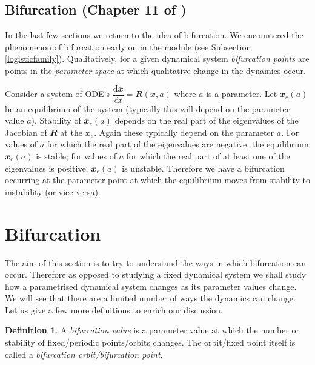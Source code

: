 \documentclass[
  a4paper,
  oneside,
  final]{krantz}
\renewcommand{\d}{\mathrm{d}}
\renewcommand{\v}[1]{{\mathbfit{#1}}}
\newcommand{\der}[2]{\dfrac{\d #1}{\d #2}}
\theoremstyle{definition}
\newtheorem{definition}{Definition}[chapter]
\theoremstyle{definition}
\theoremstyle{definition}
\theoremstyle{definition}
\theoremstyle{remark}
\begin{document}
\hypertarget{bifurcation}{%
\subsection{\texorpdfstring{Bifurcation (Chapter 11 of \citep{ASY})}{Bifurcation (Chapter 11 of {[}@ASY{]})}}\label{bifurcation}}

In the last few sections we return to the idea of bifurcation. We
encountered the phenomenon of bifurcation early on in the module (see
Subsection \ref{logisticfamily}). Qualitatively, for a given dynamical
system \emph{bifurcation points} are points in the \emph{parameter space} at which
qualitative change in the dynamics occur.

Consider a system of ODE's \(\der{\v{x}}{t} = \v{R}(\v{x}, a)\) where \(a\)
is a parameter. Let \(\v{x}_{e}(a)\) be an equilibrium of the system
(typically this will depend on the parameter value \(a\)). Stability of
\(\v{x}_{e}(a)\) depends on the real part of the eigenvalues of the
Jacobian of \(\v{R}\) at the \(\v{x}_{e}\). Again these typically
depend on the parameter \(a\). For values of \(a\) for which the real part
of the eigenvalues are negative, the equilibrium \(\v{x}_{e}(a)\) is
stable; for values of \(a\) for which the real part of at least one of the
eigenvalues is positive, \(\v{x}_{e}(a)\) is unstable. Therefore we have a
bifurcation occurring at the parameter point at which the equilibrium
moves from stability to instability (or vice versa).

\hypertarget{bifurcation-cont}{%
\section{Bifurcation}\label{bifurcation-cont}}

The aim of this section is to try to understand the ways in which
bifurcation can occur. Therefore as opposed to studying a fixed
dynamical system we shall study how a parametrised dynamical system
changes as its parameter values change. We will see that there are a
limited number of ways the dynamics can change. Let us give a few more
definitions to enrich our discussion.

\begin{definition}
\protect\hypertarget{def:bifurcvalue}{}\label{def:bifurcvalue}A \emph{bifurcation value} is a parameter value at which the number or
stability of fixed/periodic points/orbits changes. The orbit/fixed point
itself is called a \emph{bifurcation orbit/bifurcation point}.
\end{definition}
\end{document}
